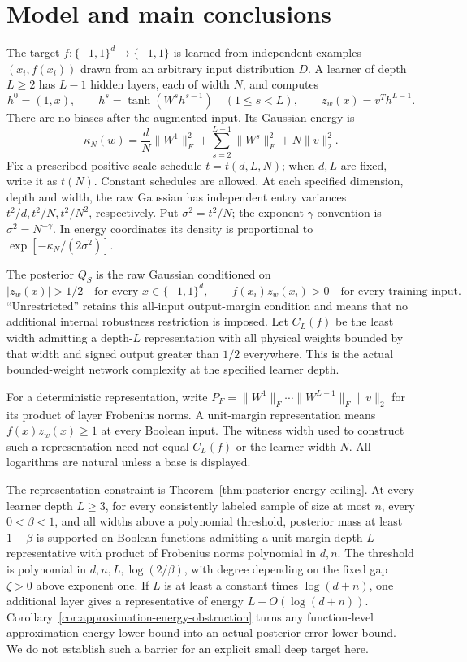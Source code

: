 \documentclass[11pt]{article}
\begin{document}
\section{Model and main conclusions}

The target $f:\{-1,1\}^d\to\{-1,1\}$ is learned from independent
examples $(x_i,f(x_i))$ drawn from an arbitrary input distribution $D$.
A learner of depth $L\ge2$ has $L-1$ hidden layers, each of width $N$,
and computes
\[
 h^0=(1,x),\qquad h^s=\tanh(W^sh^{s-1})\quad(1\le s<L),
 \qquad z_w(x)=v^Th^{L-1}.
\]
There are no biases after the augmented input. Its Gaussian energy is
\[
 \kappa_N(w)=\frac dN\|W^1\|_F^2+
    \sum_{s=2}^{L-1}\|W^s\|_F^2+N\|v\|_2^2.
\]
Fix a prescribed positive scale schedule $t=t(d,L,N)$; when $d,L$ are
fixed, write it as $t(N)$. Constant schedules are allowed. At each
specified dimension, depth and width, the raw Gaussian has independent entry variances
$t^2/d,t^2/N,t^2/N^2$, respectively. Put $\sigma^2=t^2/N$;
the exponent-$\gamma$ convention is $\sigma^2=N^{-\gamma}$.
In energy coordinates its density is proportional to
$\exp[-\kappa_N/(2\sigma^2)]$.

The posterior $Q_S$ is the raw Gaussian conditioned on
\[
 |z_w(x)|>1/2\quad\text{for every }x\in\{-1,1\}^d,
 \qquad f(x_i)z_w(x_i)>0\quad\text{for every training input}.
\]
``Unrestricted'' retains this all-input output-margin condition and
means that no additional internal robustness restriction is imposed.
Let $C_L(f)$ be the least width admitting a depth-$L$ representation
with all physical weights bounded by that width and signed output
greater than $1/2$ everywhere. This is the actual bounded-weight
network complexity at the specified learner depth.

For a deterministic representation, write
$P_F=\|W^1\|_F\cdots\|W^{L-1}\|_F\|v\|_2$ for its
product of layer Frobenius norms. A unit-margin representation means
$f(x)z_w(x)\ge1$ at every Boolean input. The witness width used to
construct such a representation need not equal $C_L(f)$ or the learner
width $N$. All logarithms are natural unless a base is displayed.

The representation constraint is
Theorem~\ref{thm:posterior-energy-ceiling}. At every learner depth $L\ge3$, for every consistently labeled
sample of size at most $n$, every $0<\beta<1$, and all widths above a
polynomial threshold, posterior mass at least $1-\beta$ is supported on
Boolean functions admitting a unit-margin
depth-$L$ representative with product of Frobenius norms polynomial
in $d,n$. The threshold is polynomial in $d,n,L,\log(2/\beta)$, with degree depending
on the fixed gap $\zeta>0$ above exponent one. If $L$ is at least a
constant times $\log(d+n)$, one additional layer gives a representative
of energy $L+O(\log(d+n))$. Corollary~\ref{cor:approximation-energy-obstruction}
turns any function-level approximation-energy lower bound into an
actual posterior error lower bound. We do not establish such a barrier
for an explicit small deep target here.
\end{document}
